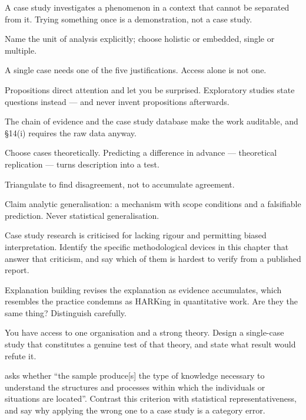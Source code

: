 \begin{chaptersummary}
\begin{tight}
  \item A case study investigates a phenomenon in a context that cannot be
    separated from it. Trying something once is a demonstration, not a case
    study.
  \item Name the unit of analysis explicitly; choose holistic or embedded,
    single or multiple.
  \item A single case needs one of the five justifications. Access alone is not
    one.
  \item Propositions direct attention and let you be surprised. Exploratory
    studies state questions instead --- and never invent propositions
    afterwards.
  \item The chain of evidence and the case study database make the work
    auditable, and \S14(i) requires the raw data anyway.
  \item Choose cases theoretically. Predicting a difference in advance ---
    theoretical replication --- turns description into a test.
  \item Triangulate to find disagreement, not to accumulate agreement.
  \item Claim analytic generalisation: a mechanism with scope conditions and a
    falsifiable prediction. Never statistical generalisation.
\end{tight}
\end{chaptersummary}

\begin{reviewq}
  \item Case study research is criticised for lacking rigour and permitting
    biased interpretation. Identify the specific methodological devices in this
    chapter that answer that criticism, and say which of them is hardest to
    verify from a published report.
  \item Explanation building revises the explanation as evidence accumulates,
    which resembles the practice  condemns as HARKing in
    quantitative work. Are they the same thing? Distinguish carefully.
  \item You have access to one organisation and a strong theory. Design a
    single-case study that constitutes a genuine test of that theory, and state
    what result would refute it.
  \item {} asks whether ``the sample produce[s] the
    type of knowledge necessary to understand the structures and processes
    within which the individuals or situations are located''. Contrast this
    criterion with statistical representativeness, and say why applying the
    wrong one to a case study is a category error.
\end{reviewq}
